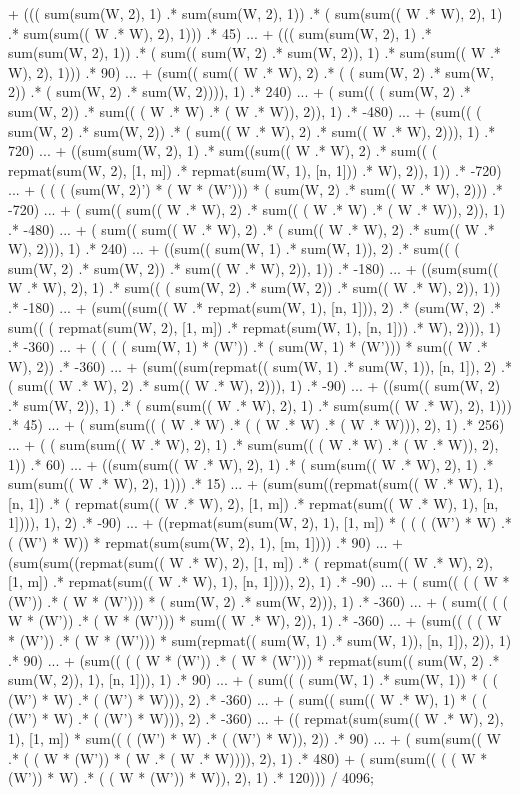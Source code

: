 \documentclass{article}
\begin{document}
  + ((( sum(sum(W, 2), 1) .* sum(sum(W, 2), 1))  .* ( sum(sum(( W .* W), 2), 1) .* sum(sum(( W .* W), 2), 1)))  .* 45) ...
  + ((( sum(sum(W, 2), 1) .* sum(sum(W, 2), 1))  .* ( sum(( sum(W, 2) .* sum(W, 2)), 1) .* sum(sum(( W .* W), 2), 1)))  .* 90) ...
  + (sum(( sum(( W .* W), 2) .* ( ( sum(W, 2) .* sum(W, 2)) .* ( sum(W, 2) .* sum(W, 2)))), 1)  .* 240) ...
  + ( sum(( ( sum(W, 2) .* sum(W, 2)) .* sum(( ( W .* W) .* ( W .* W)), 2)), 1) .* -480) ...
  + (sum(( ( sum(W, 2) .* sum(W, 2)) .* ( sum(( W .* W), 2) .* sum(( W .* W), 2))), 1)  .* 720) ...
  + ((sum(sum(W, 2), 1)  .* sum((sum(( W .* W), 2)  .* sum(( ( repmat(sum(W, 2), [1, m]) .* repmat(sum(W, 1), [n, 1])) .* W), 2)), 1))  .* -720) ...
  + ( ( ( (sum(W, 2)') * ( W * (W'))) * ( sum(W, 2) .* sum(( W .* W), 2))) .* -720) ...
  + ( sum(( sum(( W .* W), 2) .* sum(( ( W .* W) .* ( W .* W)), 2)), 1) .* -480) ...
  + ( sum(( sum(( W .* W), 2) .* ( sum(( W .* W), 2) .* sum(( W .* W), 2))), 1) .* 240) ...
  + ((sum(( sum(W, 1) .* sum(W, 1)), 2)  .* sum(( ( sum(W, 2) .* sum(W, 2)) .* sum(( W .* W), 2)), 1))  .* -180) ...
  + ((sum(sum(( W .* W), 2), 1)  .* sum(( ( sum(W, 2) .* sum(W, 2)) .* sum(( W .* W), 2)), 1))  .* -180) ...
  + (sum((sum(( W .* repmat(sum(W, 1), [n, 1])), 2)  .* (sum(W, 2)  .* sum(( ( repmat(sum(W, 2), [1, m]) .* repmat(sum(W, 1), [n, 1])) .* W), 2))), 1)  .* -360) ...
  + ( ( ( ( sum(W, 1) * (W')) .* ( sum(W, 1) * (W'))) * sum(( W .* W), 2)) .* -360) ...
  + (sum((sum(repmat(( sum(W, 1) .* sum(W, 1)), [n, 1]), 2)  .* ( sum(( W .* W), 2) .* sum(( W .* W), 2))), 1)  .* -90) ...
  + ((sum(( sum(W, 2) .* sum(W, 2)), 1)  .* ( sum(sum(( W .* W), 2), 1) .* sum(sum(( W .* W), 2), 1)))  .* 45) ...
  + ( sum(sum(( ( W .* W) .* ( ( W .* W) .* ( W .* W))), 2), 1) .* 256) ...
  + ( ( sum(sum(( W .* W), 2), 1) .* sum(sum(( ( W .* W) .* ( W .* W)), 2), 1)) .* 60) ...
  + ((sum(sum(( W .* W), 2), 1)  .* ( sum(sum(( W .* W), 2), 1) .* sum(sum(( W .* W), 2), 1)))  .* 15) ...
  + (sum(sum((repmat(sum(( W .* W), 1), [n, 1])  .* ( repmat(sum(( W .* W), 2), [1, m]) .* repmat(sum(( W .* W), 1), [n, 1]))), 1), 2)  .* -90) ...
  + ((repmat(sum(sum(W, 2), 1), [1, m])  * ( ( ( (W') * W) .* ( (W') * W)) * repmat(sum(sum(W, 2), 1), [m, 1])))  .* 90) ...
  + (sum(sum((repmat(sum(( W .* W), 2), [1, m])  .* ( repmat(sum(( W .* W), 2), [1, m]) .* repmat(sum(( W .* W), 1), [n, 1]))), 2), 1)  .* -90) ...
  + ( sum(( ( ( W * (W')) .* ( W * (W'))) * ( sum(W, 2) .* sum(W, 2))), 1) .* -360) ...
  + ( sum(( ( ( W * (W')) .* ( W * (W'))) * sum(( W .* W), 2)), 1) .* -360) ...
  + (sum(( ( ( W * (W')) .* ( W * (W'))) * sum(repmat(( sum(W, 1) .* sum(W, 1)), [n, 1]), 2)), 1)  .* 90) ...
  + (sum(( ( ( W * (W')) .* ( W * (W'))) * repmat(sum(( sum(W, 2) .* sum(W, 2)), 1), [n, 1])), 1)  .* 90) ...
  + ( sum(( ( sum(W, 1) .* sum(W, 1)) * ( ( (W') * W) .* ( (W') * W))), 2) .* -360) ...
  + ( sum(( sum(( W .* W), 1) * ( ( (W') * W) .* ( (W') * W))), 2) .* -360) ...
  + (( repmat(sum(sum(( W .* W), 2), 1), [1, m]) * sum(( ( (W') * W) .* ( (W') * W)), 2))  .* 90) ...
  + ( sum(sum(( W .* ( ( W * (W')) * ( W .* ( W .* W)))), 2), 1) .* 480)  + ( sum(sum(( ( ( W * (W')) * W) .* ( ( W * (W')) * W)), 2), 1) .* 120))) / 4096;
\end{document}
